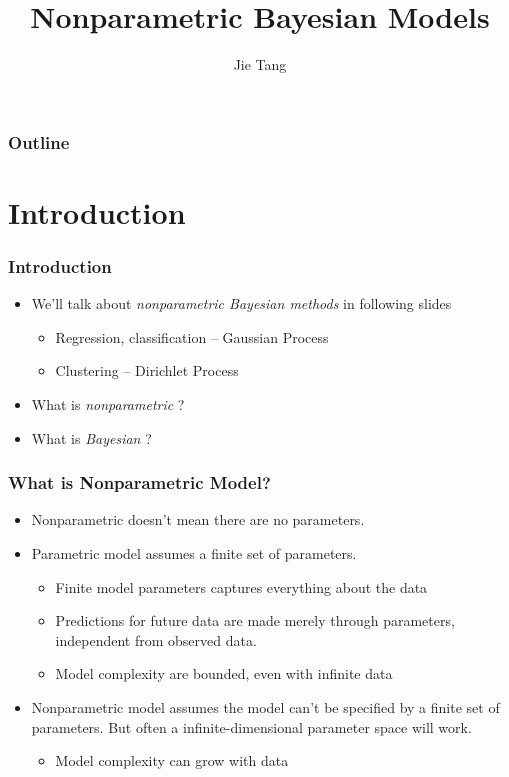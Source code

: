 \documentclass{beamer}
\title{Nonparametric Bayesian Models}
\author{Jie Tang}
\begin{document}
\begin{frame}
\titlepage
\end{frame}

\begin{frame}
\frametitle{Outline}
\tableofcontents[pausesections]
\end{frame}

\section{Introduction}
\begin{frame}
	\frametitle{Introduction}
	\begin{itemize}
		\item We'll talk about {\em nonparametric Bayesian methods} in following slides
		\begin{itemize}
			\item Regression, classification -- Gaussian Process
			\item Clustering -- Dirichlet Process
		\end{itemize}
		\item What is {\em nonparametric} ?
		\item What is {\em Bayesian} ?
	\end{itemize}
\end{frame}

\begin{frame}
	\frametitle{What is Nonparametric Model?}
	\begin{itemize}
		\item Nonparametric doesn't mean there are no parameters.
		\item {\color{red} Parametric} model assumes a finite set of parameters.
		\begin{itemize}
			\item Finite model parameters captures everything about the data
			\item Predictions for future data are made merely through parameters, independent from observed data.			
			\item Model complexity are bounded, even with infinite data 	
		\end{itemize}
		\item {\color{red} Nonparametric} model assumes the model can't be specified by a finite set of parameters. But often a infinite-dimensional parameter space will work.
		\begin{itemize}
			\item Model complexity can grow with data
		\end{itemize}
	\end{itemize}
\end{frame}
\end{document}
